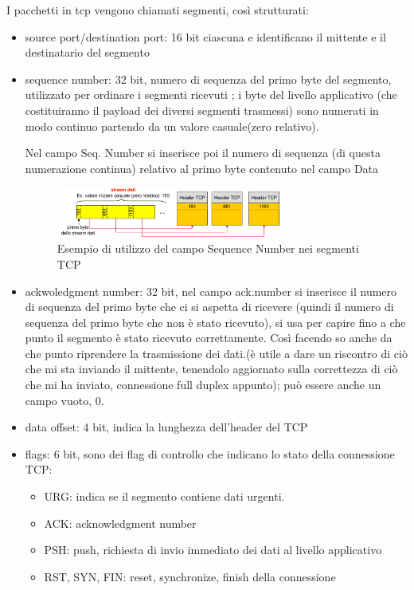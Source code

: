 I pacchetti in tcp vengono chiamati segmenti, così strutturati:
\begin{itemize}
    \item source port/destination port: 16 bit ciascuna e identificano il mittente e il destinatario del segmento
    \item sequence number: 32 bit, numero di sequenza del primo byte del segmento, utilizzato per ordinare i segmenti ricevuti ; i byte del livello applicativo (che costituiranno il payload dei
diversi segmenti trasmessi) sono numerati in modo continuo partendo da un valore casuale(zero relativo). 

Nel campo Seq. Number si inserisce poi il numero di sequenza (di questa numerazione continua)
relativo al primo byte contenuto nel campo Data
\begin{figure}[h!]
    \centering
    \includegraphics[width=0.7\textwidth]{images/sequence_number.png}
    \caption{Esempio di utilizzo del campo Sequence Number nei segmenti TCP}
    \label{fig:sequencenumber}
\end{figure}
    \item ackwoledgment number: 32 bit, nel campo ack.number si inserisce il numero di sequenza del primo byte che ci si aspetta di ricevere (quindi il numero di sequenza del primo byte che non è stato ricevuto), si usa per capire fino a che punto il segmento è stato ricevuto correttamente. Così facendo so anche da che punto riprendere la trasmissione dei dati.(è utile a dare un riscontro di ciò che mi sta inviando il mittente, tenendolo aggiornato sulla correttezza di ciò che mi ha inviato, connessione full duplex appunto); può essere anche un campo vuoto, 0.
    \item data offset: 4 bit, indica la lunghezza dell'header del TCP
    \item flags: 6 bit, sono dei flag di controllo che indicano lo stato della connessione TCP:
    \begin{itemize}
        \item URG: indica se il segmento contiene dati urgenti.
        \item ACK: acknowledgment number
        \item PSH: push, richiesta di invio immediato dei dati al livello applicativo
        \item RST, SYN, FIN: reset, synchronize, finish della connessione 

\end{itemize}
\end{itemize}
